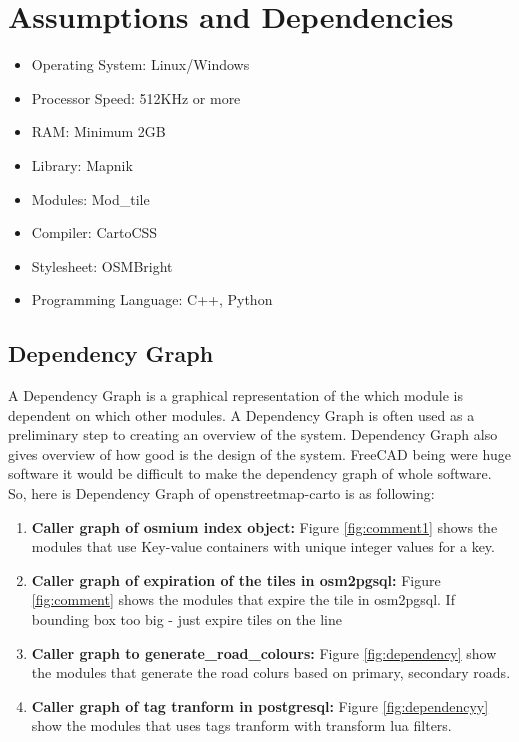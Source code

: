 \section{Assumptions and Dependencies}
\begin{itemize}
	\item Operating System: Linux/Windows
	\item Processor Speed: 512KHz or more
	\item RAM: Minimum 2GB
	\item Library: Mapnik
	\item Modules: Mod\_tile
	\item Compiler: CartoCSS
	\item Stylesheet: OSMBright
	\item Programming Language: C++, Python
\end{itemize}

\subsection{Dependency Graph}
A Dependency Graph is a graphical representation of the which module is dependent on which other modules. A Dependency Graph is often used as a preliminary step to creating an overview of the system. Dependency Graph also gives overview of how good is the design of the system.
FreeCAD being were huge software it would be difficult to make the dependency graph of whole software. So, here is  Dependency Graph of openstreetmap-carto is as following:
\begin{enumerate}
\item \textbf{Caller graph of osmium index object:} Figure \ref{fig:comment1} shows the modules that use Key-value containers with unique integer values for a key.
\item \textbf{Caller graph of expiration of the tiles in osm2pgsql:} Figure \ref{fig:comment} shows the modules that expire the tile in osm2pgsql. If bounding box too big - just expire tiles on the line
\item \textbf{Caller graph to generate\_road\_colours:} Figure \ref{fig:dependency} show the modules that generate the road colurs based on primary, secondary roads.

\item \textbf{Caller graph of tag tranform in postgresql:} Figure \ref{fig:dependencyy} show the modules that uses tags tranform with transform lua filters.
\end{enumerate}

